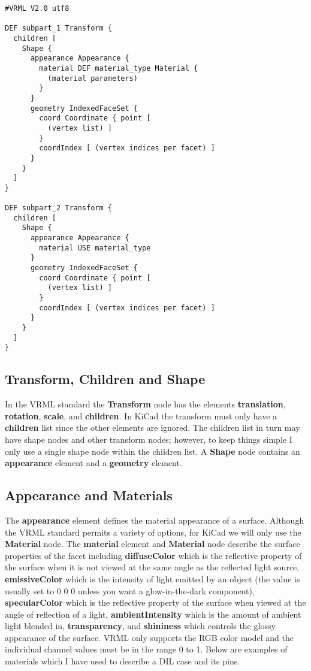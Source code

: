 \documentclass[a4paper]{article}
\begin{document}
\begin{verbatim}
#VRML V2.0 utf8

DEF subpart_1 Transform {
  children [
    Shape {
      appearance Appearance {
        material DEF material_type Material {
          (material parameters)
        }
      }
      geometry IndexedFaceSet {
        coord Coordinate { point [
          (vertex list) ]
        }
        coordIndex [ (vertex indices per facet) ]
      }
    }
  ]
}

DEF subpart_2 Transform {
  children [
    Shape {
      appearance Appearance {
        material USE material_type
      }
      geometry IndexedFaceSet {
        coord Coordinate { point [
          (vertex list) ]
        }
        coordIndex [ (vertex indices per facet) ]
      }
    }
  ]
}
\end{verbatim}

\subsection{Transform, Children and Shape}
In the VRML standard the \textbf{Transform} node has the elements \textbf{translation},
\textbf{rotation}, \textbf{scale}, and \textbf{children}. In KiCad the transform must only
have a \textbf{children} list since the other elements are ignored.
The children list in turn may have shape nodes and other
transform nodes; however, to keep things simple I only use a single shape node within
the children list. A \textbf{Shape} node contains an \textbf{appearance} element and a
\textbf{geometry} element.

\subsection{Appearance and Materials}
The \textbf{appearance} element defines the material appearance of a surface. Although the VRML
standard permits a variety of options, for KiCad we will only use the \textbf{Material} node.
The \textbf{material} element and \textbf{Material} node describe the surface properties of
the facet including \textbf{diffuseColor} which is the reflective property of the surface when it is
not viewed at the same angle as the reflected light source, \textbf{emissiveColor} which is the
intensity of light emitted by an object (the value is usually set to 0 0 0 unless you want
a glow-in-the-dark component), \textbf{specularColor} which is the reflective property of the
surface when viewed at the angle of reflection of a light, \textbf{ambientIntensity} which is the
amount of ambient light blended in, \textbf{transparency}, and \textbf{shininess} which
controls the glossy appearance of the surface. VRML only supports the RGB color model and the
individual channel values must be in the range 0 to 1. Below are examples of materials which I have used
to describe a DIL case and its pins.
\end{document}
